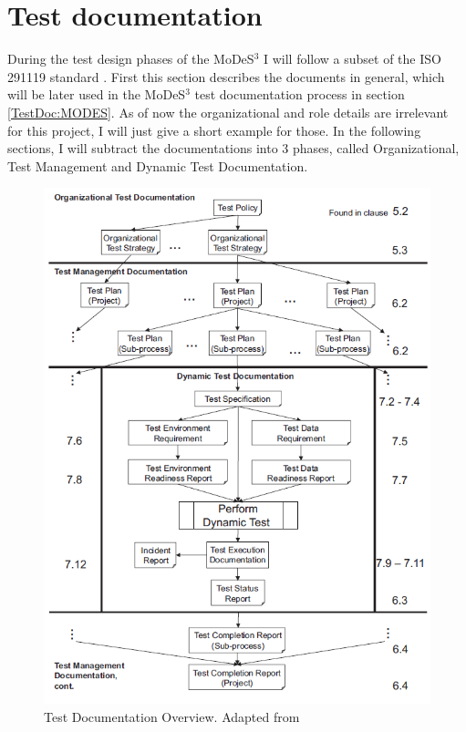 \section{Test documentation}
During the test design phases of the MoDeS$^3$ I will follow a subset of the ISO 291119 standard \cite{IEEE13}.
First this section describes the documents in general, which will be later used in the MoDeS$^3$ test documentation process in section \autoref{TestDoc:MODES}. As of now the organizational and role details are irrelevant for this project, I will just give a short example for those. In the following sections, I will subtract the documentations into 3 phases, called Organizational, Test Management and Dynamic Test Documentation. 
\begin{figure}[!h]
	\centering
	\includegraphics[width=150mm, keepaspectratio]{figures/testDesign/TestDoc.png}
	\caption{Test Documentation Overview. Adapted from \cite{IEEE13}}
	\label{fig:TestDocOverview}
\end{figure}

